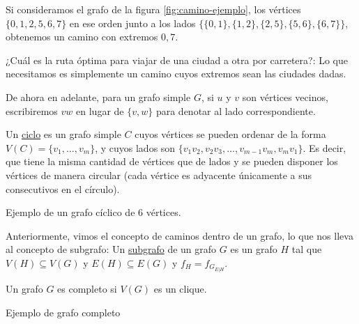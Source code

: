 \begin{ejem}
    Si consideramos el grafo de la figura \ref{fig:camino-ejemplo}, los vértices $\{0,1,2,5,6,7\}$ en ese orden junto a los lados $\{\{0,1\}, \{1,2\}, \{2,5\}, \{5,6\}, \{6,7\}\}$, obtenemos un camino con extremos $0, 7$.
\end{ejem}

\begin{prob}
    ¿Cuál es la ruta óptima para viajar de una ciudad a otra por carretera?: Lo que necesitamos es simplemente un camino cuyos extremos sean las ciudades dadas.
\end{prob}

\begin{notn}
    De ahora en adelante, para un grafo simple $G$, si $u$ y $v$ son vértices vecinos, escribiremos $vw$ en lugar de $\{v,w\}$ para denotar al lado correspondiente.
\end{notn}

\begin{defn}
    Un \ul{ciclo} es un grafo simple $C$ cuyos vértices se pueden ordenar de la forma $V(C) = \{v_1, \dots, v_m\}$, y cuyos lados son $\{v_1v_2, v_2v_3, \dots, v_{m-1}v_m, v_mv_1\}$. Es decir, que tiene la misma cantidad de vértices que de lados y se pueden disponer los vértices de manera circular (cada vértice es adyacente únicamente a sus consecutivos en el círculo).
\end{defn}

\begin{marginfigure}
    \centering
    \caption{Ejemplo de un grafo cíclico de $6$ vértices.}
\end{marginfigure}

\begin{defn}
    Anteriormente, vimos el concepto de caminos dentro de un grafo, lo que nos lleva al concepto de subgrafo: Un \ul{subgrafo} de un grafo $G$ es un grafo $H$ tal que $V(H) \subseteq V(G)$ y $E(H) \subseteq E(G)$ y $f_H = f_{G_{E|H}}$.
\end{defn}

\begin{defn}
    Un grafo $G$ es completo si $V(G)$ es un clique.
\end{defn}

\begin{marginfigure}
    \centering
    \caption{Ejemplo de grafo completo}
\end{marginfigure}

